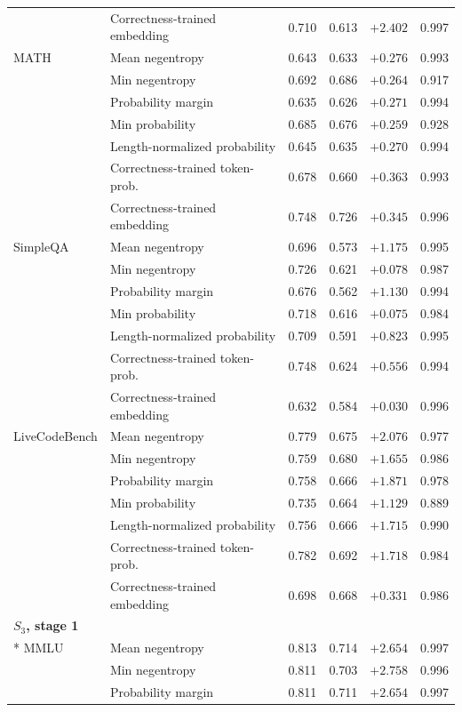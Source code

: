 \begin{longtable}{llrrrr}
 & Correctness-trained embedding &0.710 & 0.613 & $+2.402$ & 0.997 \\
MATH & Mean negentropy & 0.643 & 0.633 & $+0.276$ & 0.993 \\
 & Min negentropy & 0.692 & 0.686 & $+0.264$ & 0.917 \\
 & Probability margin & 0.635 & 0.626 & $+0.271$ & 0.994 \\
 & Min probability & 0.685 & 0.676 & $+0.259$ & 0.928 \\
 & Length-normalized probability & 0.645 & 0.635 & $+0.270$ & 0.994 \\
 & Correctness-trained token-prob. &0.678 & 0.660 & $+0.363$ & 0.993 \\
 & Correctness-trained embedding &0.748 & 0.726 & $+0.345$ & 0.996 \\
SimpleQA & Mean negentropy & 0.696 & 0.573 & $+1.175$ & 0.995 \\
 & Min negentropy & 0.726 & 0.621 & $+0.078$ & 0.987 \\
 & Probability margin & 0.676 & 0.562 & $+1.130$ & 0.994 \\
 & Min probability & 0.718 & 0.616 & $+0.075$ & 0.984 \\
 & Length-normalized probability & 0.709 & 0.591 & $+0.823$ & 0.995 \\
 & Correctness-trained token-prob. &0.748 & 0.624 & $+0.556$ & 0.994 \\
 & Correctness-trained embedding &0.632 & 0.584 & $+0.030$ & 0.996 \\
LiveCodeBench & Mean negentropy & 0.779 & 0.675 & $+2.076$ & 0.977 \\
 & Min negentropy & 0.759 & 0.680 & $+1.655$ & 0.986 \\
 & Probability margin & 0.758 & 0.666 & $+1.871$ & 0.978 \\
 & Min probability & 0.735 & 0.664 & $+1.129$ & 0.889 \\
 & Length-normalized probability & 0.756 & 0.666 & $+1.715$ & 0.990 \\
 & Correctness-trained token-prob. &0.782 & 0.692 & $+1.718$ & 0.984 \\
 & Correctness-trained embedding &0.698 & 0.668 & $+0.331$ & 0.986 \\
\multicolumn{6}{l}{\textbf{$S_3$, stage 1}} \\*
\midrule
MMLU & Mean negentropy & 0.813 & 0.714 & $+2.654$ & 0.997 \\
 & Min negentropy & 0.811 & 0.703 & $+2.758$ & 0.996 \\
 & Probability margin & 0.811 & 0.711 & $+2.654$ & 0.997 \\

\end{longtable}
